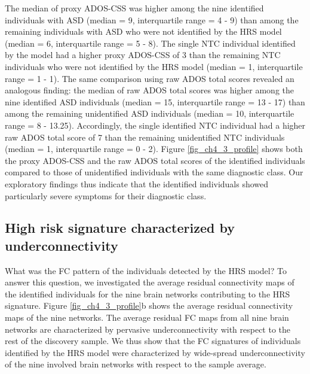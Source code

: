 \documentclass[9pt,lineno]{elife}
\begin{document}
The median of proxy ADOS-CSS was higher among the nine identified individuals with ASD (median = 9, interquartile range = 4 - 9) than among the remaining individuals with ASD who were not identified by the HRS model (median = 6, interquartile range = 5 - 8). The single NTC individual identified by the model had a higher proxy ADOS-CSS of 3 than the remaining NTC individuals who were not identified by the HRS model (median = 1, interquartile range = 1 - 1). The same comparison using raw ADOS total scores revealed an analogous finding: the median of raw ADOS total scores was higher among the nine identified ASD individuals (median = 15, interquartile range = 13 - 17) than among the remaining unidentified ASD individuals (median = 10, interquartile range = 8 - 13.25). Accordingly, the single identified NTC individual had a higher raw ADOS total score of 7 than the remaining unidentified NTC individuals (median = 1, interquartile range = 0 - 2). Figure \ref{fig_ch4_3_profile} shows both the proxy ADOS-CSS and the raw ADOS total scores of the identified individuals compared to those of unidentified individuals with the same diagnostic class. Our exploratory findings thus indicate that the identified individuals showed particularly severe symptoms for their diagnostic class.

\subsection{High risk signature characterized by underconnectivity}
What was the FC pattern of the individuals detected by the HRS model? To answer this question, we investigated the average residual connectivity maps of the identified individuals for the nine brain networks contributing to the HRS signature. Figure \ref{fig_ch4_3_profile}b shows the average residual connectivity maps of the nine networks. The average residual FC maps from all nine brain networks are characterized by pervasive underconnectivity with respect to the rest of the discovery sample. We thus show that the FC signatures of individuals identified by the HRS model were characterized by wide-spread underconnectivity of the nine involved brain networks with respect to the sample average.
\end{document}
